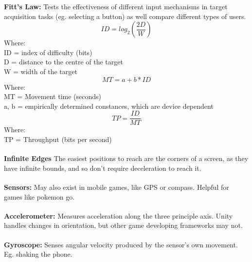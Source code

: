 \documentclass[a4paper,10pt]{article}
\begin{document}
\textcolor{Cerulean}{\textbf{Fitt's Law:}} Tests the effectiveness of different input mechanisms in target acquisition tasks (eg. selecting a button) as well compare different types of users.\\
\begin{equation*}
ID = log_{2}(\frac{2D}{W})
\end{equation*}
Where: \\ 
ID = index of difficulty (bits)\\ 
D = distance to the centre of the target \\
W = width of the target \\ 
\begin{equation*}
MT = a + b * ID
\end{equation*}
Where: \\
MT = Movement time (seconds)\\ 
a, b = empirically determined constances, which are device dependent \\ 
\begin{equation*}
TP = \frac{ID}{MT}
\end{equation*}
Where: \\
TP = Throughput (bits per second) \\\\
\textcolor{Cerulean}{\textbf{Infinite Edges}} The easiest positions to reach are the corners of a screen, as they have infinite bounds, and so don't require deceleration to reach it. \\\\
\textcolor{Cerulean}{\textbf{Sensors:}} May also exist in mobile games, like GPS or compass. Helpful for games like pokemon go. \\\\
\textcolor{Cerulean}{\textbf{Accelerometer:}} Measures acceleration along the three principle axis. Unity handles changes in orientation, but other game developing frameworks may not. \\\\
\textcolor{Cerulean}{\textbf{Gyroscope:}} Senses angular velocity produced by the sensor's own movement. Eg. shaking the phone. \\\\
\newpage
\end{document}
